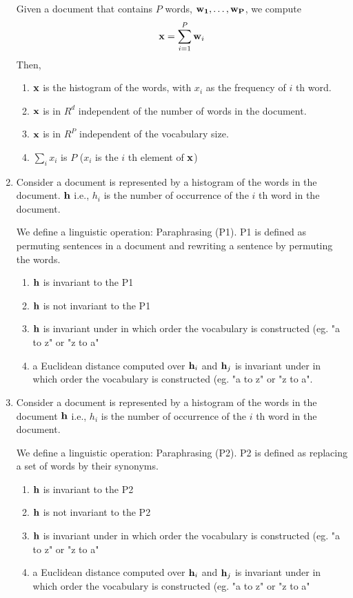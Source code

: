 \documentclass{article}
\begin{document}
\begin{enumerate}
    Given a document that contains $P$ words,  ${\bf w_1, \ldots, w_P}$, we compute
    \[ {\bf x} = \sum_{i=1}^P {\bf w}_i \]
    Then,
    \begin{enumerate}
        \item ${\bf x}$ is the histogram of the words, with $x_i$ as the frequency of $i$ th word.
        \item ${\bf x}$ is in $R^d$ independent of the number of words in the document.
        \item ${\bf x}$ is in $R^P$ independent of the vocabulary size.
        \item $\sum_{i} {x}_i$ is $P$ ($x_i$ is the $i$ th element of ${\bf x}$)
    \end{enumerate}

    \item Consider a document is represented by a histogram of the words in the document. ${\bf h}$ i.e., $h_i$ is the
    number of occurrence of the $i$ th word in the document.

    We define a linguistic operation: Paraphrasing (P1). P1 is defined as permuting sentences in a document and rewriting a sentence by permuting the words.

    \begin{enumerate}
        \item ${\bf h}$ is invariant to the P1
        \item ${\bf h}$ is not invariant to the P1
        \item ${\bf h}$ is invariant under in which order the vocabulary is constructed (eg. "a to z" or "z to a"
        \item a Euclidean distance computed over ${\bf h}_i$ and ${\bf h}_j$ is invariant under in which order the vocabulary is constructed (eg. "a to z" or "z to a".
    \end{enumerate}

    \item Consider a document is represented by a histogram of the words in the document ${\bf h}$ i.e., $h_i$ is the
    number of occurrence of the $i$ th word in the document.

    We define a linguistic operation: Paraphrasing (P2). P2 is defined as replacing a set of words by their synonyms.

    \begin{enumerate}
        \item ${\bf h}$ is invariant to the P2
        \item ${\bf h}$ is not invariant to the P2
        \item ${\bf h}$ is invariant under in which order the vocabulary is constructed (eg. "a to z" or "z to a"
        \item a Euclidean distance computed over ${\bf h}_i$ and ${\bf h}_j$ is invariant under in which order the vocabulary is constructed (eg. "a to z" or "z to a"
    \end{enumerate}


\end{enumerate}
\end{document}
